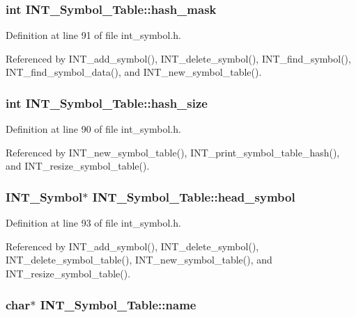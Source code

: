 \subsubsection{\setlength{\rightskip}{0pt plus 5cm}int \bf{INT\_\-Symbol\_\-Table::hash\_\-mask}}\label{structINT__Symbol__Table_04a7b58df6b6d8e3eb833adf42c614a6}




Definition at line 91 of file int\_\-symbol.h.

Referenced by INT\_\-add\_\-symbol(), INT\_\-delete\_\-symbol(), INT\_\-find\_\-symbol(), INT\_\-find\_\-symbol\_\-data(), and INT\_\-new\_\-symbol\_\-table().
\subsubsection{\setlength{\rightskip}{0pt plus 5cm}int \bf{INT\_\-Symbol\_\-Table::hash\_\-size}}\label{structINT__Symbol__Table_02475a59071a7ace59fc0eb8b8ecd3d8}




Definition at line 90 of file int\_\-symbol.h.

Referenced by INT\_\-new\_\-symbol\_\-table(), INT\_\-print\_\-symbol\_\-table\_\-hash(), and INT\_\-resize\_\-symbol\_\-table().
\subsubsection{\setlength{\rightskip}{0pt plus 5cm}\bf{INT\_\-Symbol}$\ast$ \bf{INT\_\-Symbol\_\-Table::head\_\-symbol}}\label{structINT__Symbol__Table_987a4445814d684b15e723269707ace0}




Definition at line 93 of file int\_\-symbol.h.

Referenced by INT\_\-add\_\-symbol(), INT\_\-delete\_\-symbol(), INT\_\-delete\_\-symbol\_\-table(), INT\_\-new\_\-symbol\_\-table(), and INT\_\-resize\_\-symbol\_\-table().
\subsubsection{\setlength{\rightskip}{0pt plus 5cm}char$\ast$ \bf{INT\_\-Symbol\_\-Table::name}}\label{structINT__Symbol__Table_8bd81f2fe100eed9cd874829e6b5a276}




